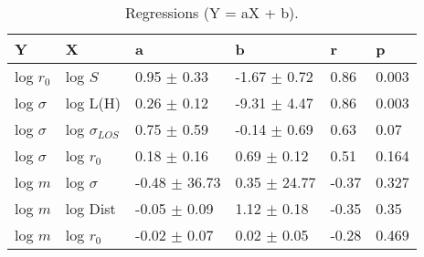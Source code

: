 \begin{table}
\centering
\caption{Regressions (Y = aX + b).}
\begin{tabular}{llllll}
\toprule
            Y &                   X &                  a &                 b &      r &      p \\
\midrule
    log $r_0$ &             log $S$ &    0.95 $\pm$ 0.33 &  -1.67 $\pm$ 0.72 &   0.86 &  0.003 \\
 log $\sigma$ &            log L(H) &    0.26 $\pm$ 0.12 &  -9.31 $\pm$ 4.47 &   0.86 &  0.003 \\
 log $\sigma$ &  log $\sigma_{LOS}$ &    0.75 $\pm$ 0.59 &  -0.14 $\pm$ 0.69 &   0.63 &   0.07 \\
 log $\sigma$ &         log $r_{0}$ &    0.18 $\pm$ 0.16 &   0.69 $\pm$ 0.12 &   0.51 &  0.164 \\
      log $m$ &        log $\sigma$ &  -0.48 $\pm$ 36.73 &  0.35 $\pm$ 24.77 &  -0.37 &  0.327 \\
      log $m$ &            log Dist &   -0.05 $\pm$ 0.09 &   1.12 $\pm$ 0.18 &  -0.35 &   0.35 \\
      log $m$ &         log $r_{0}$ &   -0.02 $\pm$ 0.07 &   0.02 $\pm$ 0.05 &  -0.28 &  0.469 \\
\bottomrule
\end{tabular}
\end{table}
